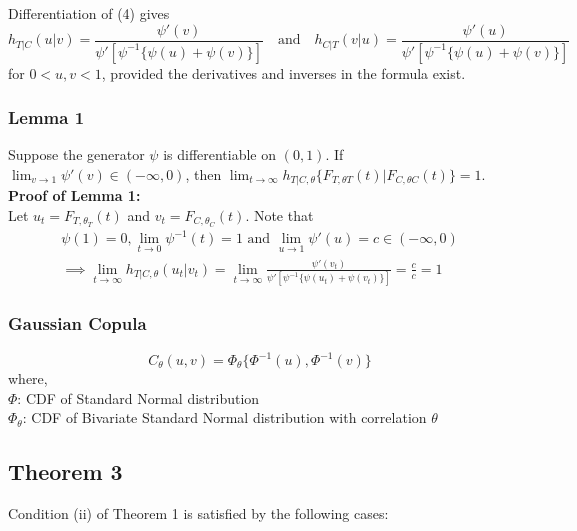 Differentiation of (4) gives
\[
h_{T|C}(u|v) = \frac{\psi'(v)}{\psi' \left[ \psi^{-1}\{\psi(u) + \psi(v)\}\right]} \quad \text{and} \quad h_{C|T}(v|u) = \frac{\psi'(u)}{\psi' \left[ \psi^{-1}\{\psi(u) + \psi(v)\}\right]} 
\]
for \( 0 < u,v < 1 \), provided the derivatives and inverses in the formula exist.

\subsubsection*{Lemma 1}
Suppose the generator \( \psi \) is differentiable on \( (0, 1) \). If \( \lim_{v \to 1} \psi'(v) \in (-\infty, 0) \), then
\(
\lim_{t \to \infty} h_{T|C,\theta}\{F_{T,\theta T}(t) | F_{C,\theta C}(t)\} = 1.
\)\\
\textbf{Proof of Lemma 1:}\\
Let $u_t = F_{T, \theta_T} (t)$ and $ v_t = F_{C, \theta_C} (t)$. Note that 
\begin{align*}
	\psi(1) =0, \lim_{t \to 0} \psi^{-1}(t) = 1 \text{ and } \lim_{u \to 1} \psi'(u) = c \in (-\infty, 0)\\
\implies \lim_{t \to \infty} h_{T|C, \theta} (u_t | v_t) = \lim_{t \to \infty} \frac{\psi'(v_t)}{\psi' \left[ \psi^{-1}\{\psi(u_t) + \psi(v_t)\}\right]} = \frac{c}{c} = 1
\end{align*}

\subsubsection*{Gaussian Copula}
\begin{equation*}
C_\theta (u, v) = \Phi_\theta \{ \Phi^{-1} (u), \Phi^{-1} (v) \}
\end{equation*}
where,\\
$\Phi$: CDF of Standard Normal distribution\\
$\Phi_\theta$: CDF of Bivariate Standard Normal distribution with correlation $\theta$

\subsection*{Theorem 3}
Condition (ii) of Theorem 1 is satisfied by the following cases:

